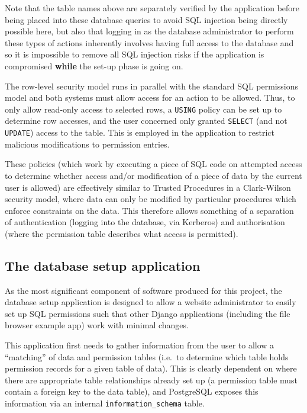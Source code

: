 \documentclass{article}
\begin{document}
Note that the table names above are separately verified by the application before being placed into these database queries to avoid SQL injection being directly possible here, but also that logging in as the database administrator to perform these types of actions inherently involves having full access to the database and so it is impossible to remove all SQL injection risks if the application is compromised \textbf{while} the set-up phase is going on.

The row-level security model runs in parallel with the standard SQL permissions model and both systems must allow access for an action to be allowed. Thus, to only allow read-only access to selected rows, a \texttt{USING} policy can be set up to determine row accesses, and the user concerned only granted \texttt{SELECT} (and not \texttt{UPDATE}) access to the table. This is employed in the application to restrict malicious modifications to permission entries.

These policies (which work by executing a piece of SQL code on attempted access to determine whether access and/or modification of a piece of data by the current user is allowed) are effectively similar to Trusted Procedures in a Clark-Wilson security model, where data can only be modified by particular procedures which enforce constraints on the data. This therefore allows something of a separation of authentication (logging into the database, via Kerberos) and authorisation (where the permission table describes what access is permitted).

\subsection{The database setup application}
As the most significant component of software produced for this project, the database setup application is designed to allow a website administrator to easily set up SQL permissions such that other Django applications (including the file browser example app) work with minimal changes.

This application first needs to gather information from the user to allow a ``matching'' of data and permission tables (i.e.\ to determine which table holds permission records for a given table of data). This is clearly dependent on where there are appropriate table relationships already set up (a permission table must contain a foreign key to the data table), and PostgreSQL exposes this information via an internal \verb+information_schema+ table.
\end{document}
